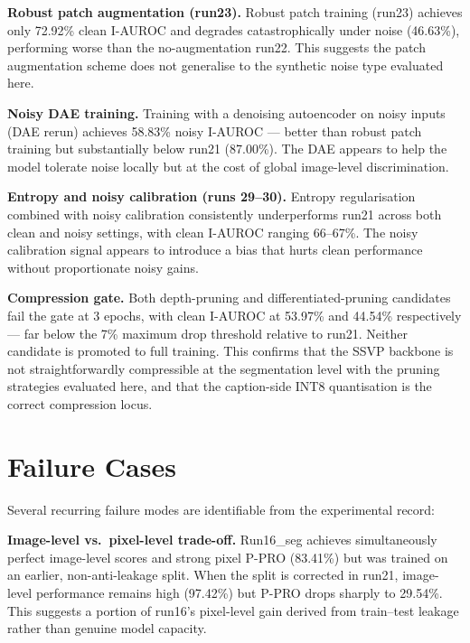 \documentclass[11pt]{article}
\begin{document}
\textbf{Robust patch augmentation (run23).} Robust patch training (run23) achieves
only 72.92\% clean I-AUROC and degrades catastrophically under noise (46.63\%),
performing worse than the no-augmentation run22. This suggests the patch augmentation
scheme does not generalise to the synthetic noise type evaluated here.

\textbf{Noisy DAE training.} Training with a denoising autoencoder on noisy inputs
(DAE rerun) achieves 58.83\% noisy I-AUROC — better than robust patch training but
substantially below run21 (87.00\%). The DAE appears to help the model tolerate
noise locally but at the cost of global image-level discrimination.

\textbf{Entropy and noisy calibration (runs 29--30).} Entropy regularisation
combined with noisy calibration consistently underperforms run21 across both clean
and noisy settings, with clean I-AUROC ranging 66--67\%. The noisy calibration
signal appears to introduce a bias that hurts clean performance without
proportionate noisy gains.

\textbf{Compression gate.} Both depth-pruning and differentiated-pruning candidates
fail the gate at 3 epochs, with clean I-AUROC at 53.97\% and 44.54\% respectively
— far below the 7\% maximum drop threshold relative to run21. Neither candidate
is promoted to full training. This confirms that the SSVP backbone is not
straightforwardly compressible at the segmentation level with the pruning strategies
evaluated here, and that the caption-side INT8 quantisation is the correct
compression locus.

\section{Failure Cases}

Several recurring failure modes are identifiable from the experimental record:

\textbf{Image-level vs.\ pixel-level trade-off.} Run16\_seg achieves
simultaneously perfect image-level scores and strong pixel P-PRO (83.41\%) but
was trained on an earlier, non-anti-leakage split. When the split is corrected in
run21, image-level performance remains high (97.42\%) but P-PRO drops sharply to
29.54\%. This suggests a portion of run16's pixel-level gain derived from
train--test leakage rather than genuine model capacity.
\end{document}
